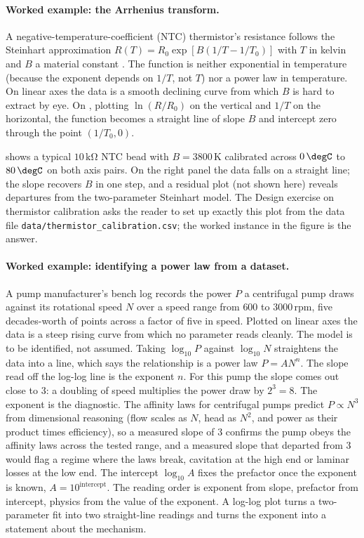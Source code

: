 \paragraph{Worked example: the Arrhenius transform.}
A negative-temperature-coefficient (NTC) thermistor's resistance
follows the Steinhart approximation
$R(T) = R_{0} \exp[B(1/T - 1/T_{0})]$ with $T$ in kelvin and $B$ a
material constant \cite{v2c02-paper:steinhart-hart-1968}. The
function is neither exponential in temperature (because the
exponent depends on $1/T$, not $T$) nor a power law in temperature.
On linear axes the data is a smooth declining curve from which $B$
is hard to extract by eye. On , plotting
$\ln(R/R_{0})$ on the vertical and $1/T$ on the horizontal, the
function becomes a straight line of slope $B$ and intercept zero
through the point $(1/T_{0}, 0)$.

 shows a typical
$10\,\si{\kilo\ohm}$ NTC bead with $B = 3800\,\si{\kelvin}$
calibrated across $0\,\degC$ to $80\,\degC$ on both axis pairs. On
the right panel the data falls on a straight line; the slope
recovers $B$ in one step, and a residual plot (not shown here)
reveals departures from the two-parameter Steinhart model. The
Design exercise on thermistor calibration asks the reader to set
up exactly this plot from the data file
\texttt{data/thermistor\_calibration.csv}; the worked instance in
the figure is the answer.

\paragraph{Worked example: identifying a power law from a dataset.}
A pump manufacturer's bench log records the power $P$ a centrifugal
pump draws against its rotational speed $N$ over a speed range from
$600$ to $3000\,\text{rpm}$, five decades-worth of points across a
factor of five in speed. Plotted on linear axes the data is a steep
rising curve from which no parameter reads cleanly. The model is to
be identified, not assumed. Taking $\log_{10} P$ against $\log_{10}
N$ straightens the data into a line, which says the relationship is a
power law $P = A N^{n}$. The slope read off the log-log line is the
exponent $n$. For this pump the slope comes out close to $3$: a
doubling of speed multiplies the power draw by $2^{3} = 8$. The
exponent is the diagnostic. The affinity laws for centrifugal pumps
predict $P \propto N^{3}$ from dimensional reasoning (flow scales as
$N$, head as $N^{2}$, and power as their product times efficiency),
so a measured slope of $3$ confirms the pump obeys the affinity laws
across the tested range, and a measured slope that departed from $3$
would flag a regime where the laws break, cavitation at the high end
or laminar losses at the low end. The intercept $\log_{10} A$ fixes
the prefactor once the exponent is known, $A = 10^{\text{intercept}}$.
The reading order is exponent from slope, prefactor from intercept,
physics from the value of the exponent. A log-log plot turns a
two-parameter fit into two straight-line readings and turns the
exponent into a statement about the mechanism.

